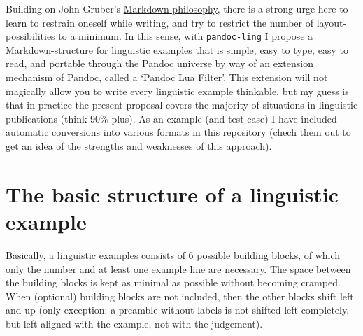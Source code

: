 \documentclass[
]{article}
\begin{document}
Building on John Gruber's
\href{https://daringfireball.net/projects/markdown/syntax}{Markdown
philosophy}, there is a strong urge here to learn to restrain oneself
while writing, and try to restrict the number of layout-possibilities to
a minimum. In this sense, with \texttt{pandoc-ling} I propose a
Markdown-structure for linguistic examples that is simple, easy to type,
easy to read, and portable through the Pandoc universe by way of an
extension mechanism of Pandoc, called a `Pandoc Lua Filter'. This
extension will not magically allow you to write every linguistic example
thinkable, but my guess is that in practice the present proposal covers
the majority of situations in linguistic publications (think 90\%-plus).
As an example (and test case) I have included automatic conversions into
various formats in this repository (chech them out to get an idea of the
strengths and weaknesses of this approach).

\hypertarget{the-basic-structure-of-a-linguistic-example}{%
\section{The basic structure of a linguistic
example}\label{the-basic-structure-of-a-linguistic-example}}

Basically, a linguistic examples consists of 6 possible building blocks,
of which only the number and at least one example line are necessary.
The space between the building blocks is kept as minimal as possible
without becoming cramped. When (optional) building blocks are not
included, then the other blocks shift left and up (only exception: a
preamble without labels is not shifted left completely, but left-aligned
with the example, not with the judgement).
\end{document}
